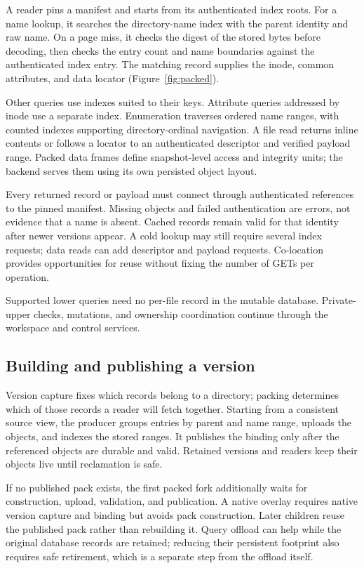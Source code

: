 A reader pins a manifest and starts from its authenticated index roots.
For a name lookup, it searches the directory-name index with the parent
identity and raw name. On a page miss, it checks the digest of the
stored bytes before decoding, then checks the entry count and name
boundaries against the authenticated index entry. The matching record
supplies the inode, common attributes, and data locator
(Figure~\ref{fig:packed}).

Other queries use indexes suited to their keys. Attribute queries
addressed by inode use a separate index. Enumeration traverses ordered
name ranges, with counted indexes supporting directory-ordinal navigation.
A file read returns inline contents or follows a locator to an
authenticated descriptor and verified payload range. Packed data frames
define snapshot-level access and integrity units; the backend serves
them using its own persisted object layout.

Every returned record or payload must connect through authenticated
references to the pinned manifest. Missing objects and failed
authentication are errors, not evidence that a name is absent. Cached
records remain valid for that identity after newer versions appear.
A cold lookup may still require several index requests; data reads can
add descriptor and payload requests. Co-location provides opportunities
for reuse without fixing the number of GETs per operation.

Supported lower queries need no per-file record in the mutable database.
Private-upper checks, mutations, and ownership coordination continue
through the workspace and control services.

\subsection{Building and publishing a version}

Version capture fixes which records belong to a directory; packing
determines which of those records a reader will fetch together.
Starting from a consistent source view, the producer groups entries by
parent and name range, uploads the objects, and indexes the stored
ranges. It publishes the binding only after the referenced objects are
durable and valid. Retained versions and readers keep their objects
live until reclamation is safe.

If no published pack exists, the first packed fork additionally waits
for construction, upload, validation, and publication. A native overlay
requires native version capture and binding but avoids pack construction.
Later children reuse the published pack rather than rebuilding it. Query
offload can help while the original database records are retained;
reducing their persistent footprint also requires safe retirement, which
is a separate step from the offload itself.

